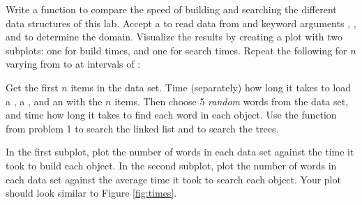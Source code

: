 \begin{problem}
Write a function to compare the speed of building and searching the different data structures of this lab.
Accept a  to read data from and keyword arguments , , and  to determine the domain.
Visualize the results by creating a plot with two subplots: one for build times, and one for search times.
Repeat the following for $n$ varying from  to  at intervals of :

Get the first $n$ items in the data set.
Time (separately) how long it takes to load a , a , and an  with the $n$ items.
Then choose 5 \emph{random} words from the data set, and time how long it takes to find each word in each object.
Use the  function from problem 1 to search the linked list and  to search the trees.

In the first subplot, plot the number of words in each data set against the time it took to build each object.
In the second subplot, plot the number of words in each data set against the average time it took to search each object.
Your plot should look similar to Figure \ref{fig:times}.


\end{problem}
